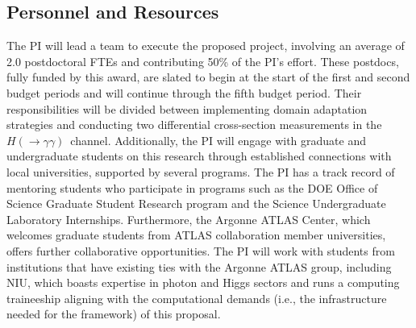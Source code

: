 \documentclass[letter, USenglish, 11pt, subfigure]{article}
\newcommand{\hyy}{\ensuremath{H(\to\gamma\gamma)}}
\begin{document}
\subsection{Personnel and Resources}
\label{sec:personnel}
The PI will lead a team to execute the proposed project, involving an average of 2.0 postdoctoral FTEs and contributing 50\% of the PI's effort. These postdocs, fully funded by this award, are slated to begin at the start of the first and second budget periods and will continue through the fifth budget period. Their responsibilities will be divided between implementing domain adaptation strategies and conducting two differential cross-section measurements in the \hyy\ channel.
Additionally, the PI will engage with graduate and undergraduate students on this research through established connections with local universities, supported by several programs. The PI has a track record of mentoring students who participate in programs such as the DOE Office of Science Graduate Student Research program and the Science Undergraduate Laboratory Internships. Furthermore, the Argonne ATLAS Center, which welcomes graduate students from ATLAS collaboration member universities, offers further collaborative opportunities. The PI will work with students from institutions that have existing ties with the Argonne ATLAS group, including NIU, which boasts expertise in photon and Higgs sectors and runs a computing traineeship aligning with the computational demands (i.e., the infrastructure needed for the framework) of this proposal.
\end{document}
